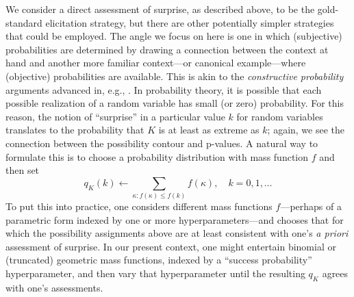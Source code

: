 \documentclass[12pt]{article}
\begin{document}
We consider a direct assessment of surprise, as described above, to be the gold-standard elicitation strategy, but there are other potentially simpler strategies that could be employed.  The angle we focus on here is one in which (subjective) probabilities are determined by drawing a connection between the context at hand and another more familiar context---or canonical example---where (objective) probabilities are available.  This is akin to the {\em constructive probability} arguments advanced in, e.g., \citet{shafer1985languages}.  In probability theory, it is possible that each possible realization of a random variable has small (or zero) probability.  For this reason, the notion of ``surprise'' in a particular value $k$ for random variables translates to the probability that $K$ is at least as extreme as $k$; again, we see the connection between the possibility contour and p-values.  A natural way to formulate this is to choose a probability distribution with mass function $f$ and then set 
\[ q_K(k) \gets \sum_{\kappa: f(\kappa) \leq f(k)} f(\kappa), \quad k=0,1,\ldots \]
To put this into practice, one considers different mass functions $f$---perhaps of a parametric form indexed by one or more hyperparameters---and chooses that for which the possibility assignments above are at least consistent with one's {\em a priori} assessment of surprise.  In our present context, one might entertain binomial or (truncated) geometric mass functions, indexed by a ``success probability'' hyperparameter, and then vary that hyperparameter until the resulting $q_K$ agrees with one's assessments.  
\end{document}
